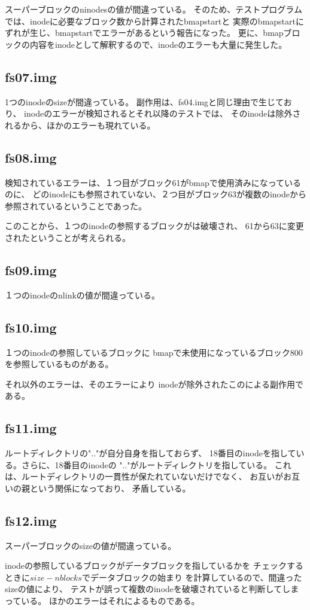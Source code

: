 \documentclass[a4j,11pt]{jarticle}
\begin{document}
スーパーブロックのninodesの値が間違っている。
そのため、テストプログラムでは、inodeに必要なブロック数から計算されたbmapstartと
実際のbmapstartにずれが生じ、bmapstartでエラーがあるという報告になった。
更に、bmapブロックの内容をinodeとして解釈するので、inodeのエラーも大量に発生した。

\subsection*{fs07.img}

1つのinodeのsizeが間違っている。
副作用は、fs04.imgと同じ理由で生じており、
inodeのエラーが検知されるとそれ以降のテストでは、
そのinodeは除外されるから、ほかのエラーも現れている。

\subsection*{fs08.img}

検知されているエラーは、１つ目がブロック61がbmapで使用済みになっているのに、
どのinodeにも参照されていない、２つ目がブロック63が複数のinodeから
参照されているということであった。

このことから、１つのinodeの参照するブロックがは破壊され、
61から63に変更されたということが考えられる。

\subsection*{fs09.img}

１つのinodeのnlinkの値が間違っている。

\subsection*{fs10.img}

１つのinodeの参照しているブロックに
bmapで未使用になっているブロック800
を参照しているものがある。

それ以外のエラーは、そのエラーにより
inodeが除外されたこのによる副作用である。

\subsection*{fs11.img}

ルートディレクトリの".."が自分自身を指しておらず、
18番目のinodeを指している。さらに、18番目のinodeの
".."がルートディレクトリを指している。
これは、ルートディレクトリの一貫性が保たれていないだけでなく、
お互いがお互いの親という関係になっており、
矛盾している。

\subsection*{fs12.img}

スーパーブロックのsizeの値が間違っている。

inodeの参照しているブロックがデータブロックを指しているかを
チェックするときに$size - nblocks$でデータブロックの始まり
を計算しているので、間違ったsizeの値により、
テストが誤って複数のinodeを破壊されていると判断してしまっている。
ほかのエラーはそれによるものである。
\end{document}
